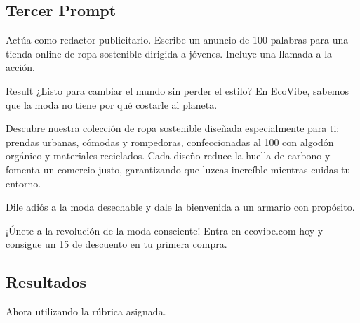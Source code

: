\documentclass[12pt,a4paper]{article}
\begin{document}
\subsection{Tercer Prompt}
\begin{AgenticPromptbox}
    Actúa como redactor publicitario. Escribe un anuncio de 100 palabras para una tienda online de ropa sostenible dirigida a jóvenes. Incluye una llamada a la acción.
\end{AgenticPromptbox}

\begin{result}{Result}
    ¿Listo para cambiar el mundo sin perder el estilo? En EcoVibe, sabemos que la moda no tiene por qué costarle al planeta.

Descubre nuestra colección de ropa sostenible diseñada especialmente para ti: prendas urbanas, cómodas y rompedoras, confeccionadas al 100 con algodón orgánico y materiales reciclados. Cada diseño reduce la huella de carbono y fomenta un comercio justo, garantizando que luzcas increíble mientras cuidas tu entorno.

Dile adiós a la moda desechable y dale la bienvenida a un armario con propósito.

¡Únete a la revolución de la moda consciente! Entra en ecovibe.com hoy y consigue un 15 de descuento en tu primera compra.
\end{result}

\subsection{Resultados}

Ahora utilizando la rúbrica asignada.
\end{document}
